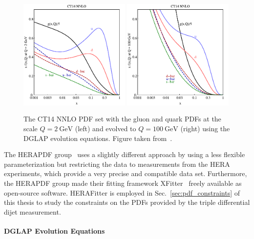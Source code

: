 \begin{figure}[htbp] 
    \centering
    \includegraphics[width=0.49\textwidth]{figures/theoretical_foundations/ct14_2.pdf}\hfill
    \includegraphics[width=0.49\textwidth]{figures/theoretical_foundations/ct14_100.pdf}
    \caption[CT14 NNLO PDF sets]{The CT14 NNLO PDF set with the gluon and quark
        PDFs at the scale $Q=\SI{2}{\GeV}$ (left) and evolved to $Q=\SI{100}{\GeV}$
    (right) using the DGLAP evolution equations. Figure taken
    from~\cite{Dulat:2015mca}.}
    \label{fig:ct14_parton_distributions} 
\end{figure}

The HERAPDF group~\cite{Abramowicz:2015mha} uses a slightly different approach
by using a less flexible parameterization but restricting the data to
measurements from the HERA experiments, which provide a very precise and
compatible data set. Furthermore, the HERAPDF group made their fitting framework
XFitter~\cite{Alekhin:2014irh} freely available as open-source software.
HERAFitter is employed in Sec.~\ref{sec:pdf_constraints} of this thesis to study
the constraints on the PDFs provided by the triple differential dijet
measurement.

\paragraph{DGLAP Evolution Equations}

